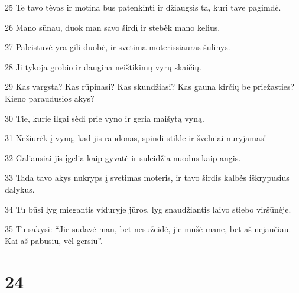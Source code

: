 \par 25 Te tavo tėvas ir motina bus patenkinti ir džiaugsis ta, kuri tave pagimdė. 
\par 26 Mano sūnau, duok man savo širdį ir stebėk mano kelius. 
\par 27 Paleistuvė yra gili duobė, ir svetima moteris­siauras šulinys. 
\par 28 Ji tykoja grobio ir daugina neištikimų vyrų skaičių. 
\par 29 Kas vargsta? Kas rūpinasi? Kas skundžiasi? Kas gauna kirčių be priežasties? Kieno paraudusios akys? 
\par 30 Tie, kurie ilgai sėdi prie vyno ir geria maišytą vyną. 
\par 31 Nežiūrėk į vyną, kad jis raudonas, spindi stikle ir švelniai nuryjamas! 
\par 32 Galiausiai jis įgelia kaip gyvatė ir suleidžia nuodus kaip angis. 
\par 33 Tada tavo akys nukryps į svetimas moteris, ir tavo širdis kalbės iškrypusius dalykus. 
\par 34 Tu būsi lyg miegantis viduryje jūros, lyg snaudžiantis laivo stiebo viršūnėje. 
\par 35 Tu sakysi: “Jie sudavė man, bet nesužeidė, jie mušė mane, bet aš nejaučiau. Kai aš pabusiu, vėl gersiu”.



\chapter{24}


